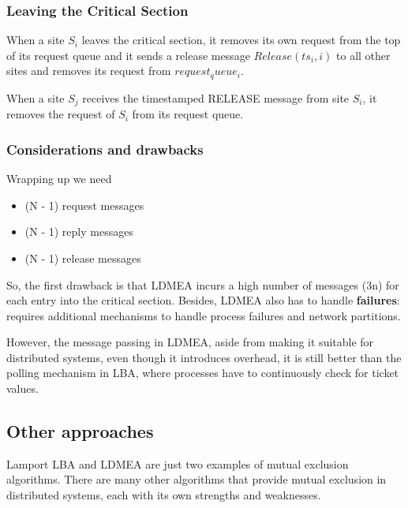 \subsubsection{Leaving the Critical Section}
When a site $S_i$ leaves the critical section, it removes its own request from the top of its request queue and it sends a release message $Release(ts_i, i)$ to all other sites and removes its request from $request_queue_i$.

When a site $S_j$ receives the timestamped RELEASE message from site $S_i$, it removes the request of $S_i$ from its request queue.

\subsubsection{Considerations and drawbacks}

Wrapping up we need
\begin{itemize}
   \item (N - 1) request messages
   \item (N - 1) reply messages
   \item (N - 1) release messages
\end{itemize}
So, the first drawback is that LDMEA incurs a high number of messages (3n) for each entry into the critical section. 
Besides, LDMEA also has to handle \textbf{failures}: requires additional mechanisms to handle process failures and network partitions.

However, the message passing in LDMEA, aside from making it suitable for distributed systems, even though it introduces overhead, it is still better than the polling mechanism in LBA, where processes have to continuously check for ticket values.

\subsection{Other approaches}
Lamport LBA and LDMEA are just two examples of mutual exclusion algorithms. There are many other algorithms that provide mutual exclusion in distributed systems, each with its own strengths and weaknesses.

